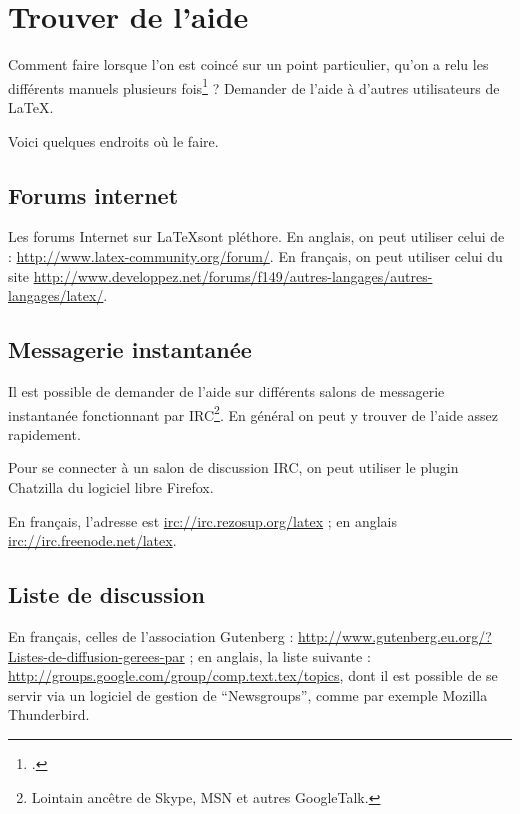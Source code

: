 \chapter{Trouver de l'aide}

\begin{intro}
Comment faire lorsque l'on est coincé sur un point particulier, qu'on a relu les différents manuels plusieurs fois\footcite[Signalons au passage la possibilité de télécharger une aide sur l'ensemble des erreurs de compilation avec \LaTeX :][]{erreurscompilo} ? Demander de l'aide à d'autres utilisateurs de \LaTeX{}.

Voici quelques endroits où le faire.
\end{intro}


\section{Forums internet}

Les forums Internet sur \LaTeX sont pléthore. En anglais, on peut utiliser celui de  : \url{http://www.latex-community.org/forum/}. En français, on peut utiliser celui du site  \url{http://www.developpez.net/forums/f149/autres-langages/autres-langages/latex/}.


\section{Messagerie instantanée}

Il est possible de demander de l'aide sur différents salons de messagerie instantanée fonctionnant par IRC\footnote{Lointain ancêtre de Skype, MSN et autres GoogleTalk.}. En général on peut y trouver de l'aide assez rapidement.

Pour se connecter à un salon de discussion IRC, on peut utiliser le plugin Chatzilla du logiciel libre Firefox.

En français, l'adresse est \url{irc://irc.rezosup.org/latex} ; en anglais
\url{irc://irc.freenode.net/latex}.


\section{Liste de discussion}

En français, celles de l'association Gutenberg : \url{http://www.gutenberg.eu.org/?Listes-de-diffusion-gerees-par} ; en anglais,  la liste suivante : \url{http://groups.google.com/group/comp.text.tex/topics}, dont il est possible de se servir via un logiciel de gestion de \enquote{Newsgroups}, comme par exemple Mozilla Thunderbird.
